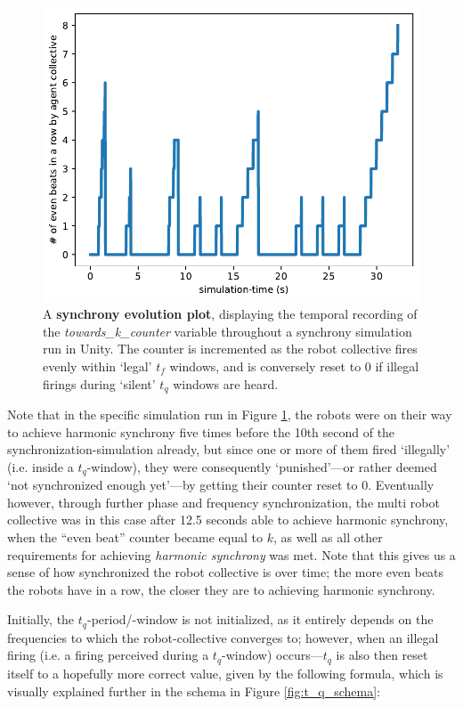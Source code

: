 	\begin{figure}[h]
		\centering
		\includegraphics[width=0.85\linewidth]{Assets/DocSegments/Chapters/ExperimentsAndResults/Figures/Explanations/SynchronyEvolutionPlot.pdf}
		\caption[Simulation run plot: harmonic synchrony evolution plot.]{A \textbf{synchrony evolution plot}, displaying the temporal recording of the \textit{towards\_k\_counter} variable throughout a synchrony simulation run in Unity. The counter is incremented as the robot collective fires evenly within `legal' $t_f$ windows, and is conversely reset to 0 if illegal firings during `silent' $t_q$ windows are heard.}
		\label{fig:harmonic_synch_evolution}
	\end{figure}

	Note that in the specific simulation run in Figure \ref{fig:harmonic_synch_evolution}, the robots were on their way to achieve harmonic synchrony five times before the 10th second of the synchronization-simulation already, but since one or more of them fired `illegally' (i.e. inside a $t_q$-window), they were consequently `punished'—or rather deemed `not synchronized enough yet'—by getting their counter reset to 0. Eventually however, through further phase and frequency synchronization, the multi robot collective was in this case after 12.5 seconds able to achieve harmonic synchrony, when the ``even beat'' counter became equal to $k$, as well as all other requirements for achieving \textit{harmonic synchrony} was met. Note that this gives us a sense of how synchronized the robot collective is over time; the more even beats the robots have in a row, the closer they are to achieving harmonic synchrony.

	Initially, the $t_q$-period/-window is not initialized, as it entirely depends on the frequencies to which the robot-collective converges to; however, when an illegal firing (i.e. a firing perceived during a $t_q$-window) occurs—$t_q$ is also then reset itself to a hopefully more correct value, given by the following formula, which is visually explained further in the schema in Figure \ref{fig:t_q_schema}:


